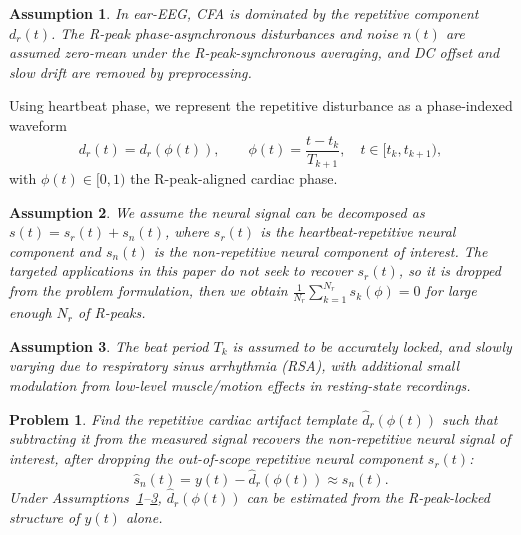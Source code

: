\documentclass[conference]{IEEEtran}
\newtheorem{assumption}{Assumption}
\newtheorem{problem}{Problem}
\begin{document}
\begin{assumption}\label{asm:cfa_dominant}
In ear-EEG, CFA is dominated by the repetitive component $d_r(t)$. The R-peak
phase-asynchronous disturbances and noise $n(t)$ are assumed zero-mean under the R-peak-synchronous averaging, and DC offset and slow drift are removed
by preprocessing.
\end{assumption}

Using heartbeat phase, we represent the repetitive disturbance as a phase-indexed waveform
\begin{equation}
d_r(t) = d_r\!\left(\phi(t)\right), \qquad
\phi(t) = \frac{t - t_k}{T_{k+1}}, \quad t \in [t_k, t_{k+1}),
\label{eq:phase_model}
\end{equation}
with $\phi(t)\in[0,1)$ the R-peak-aligned cardiac phase. 

\begin{assumption}\label{asm:neural_not_phase_locked}
We assume the neural signal can be decomposed as $s(t)=s_r(t)+s_n(t)$, where $s_r(t)$ is the
heartbeat-repetitive neural component and $s_n(t)$ is the non-repetitive neural component of interest.
The targeted applications in this paper do not seek to recover $s_r(t)$, so it is dropped from the
problem formulation, then we obtain $\frac{1}{N_r}\sum_{k=1}^{N_r} s_k(\phi) =0$ for large enough $N_r$ of R-peaks.
\end{assumption}
\begin{assumption}\label{asm:rpeak_T_varying}\label{asm:tk_slowly_varying}
The beat period $T_k$ is assumed to be accurately locked, and slowly varying due to respiratory sinus arrhythmia (RSA), with
additional small modulation from low-level muscle/motion effects in resting-state recordings.
\end{assumption}

\begin{problem}\label{prob:cfa_removal}
Find the repetitive cardiac artifact template $\hat{d}_r(\phi(t))$ such that subtracting it from
the measured signal recovers the non-repetitive neural signal of interest, after dropping the
out-of-scope repetitive neural component $s_r(t)$:
\begin{equation}
\hat{s}_n(t) = y(t) - \hat{d}_r\!\left(\phi(t)\right) \approx s_n(t).
\label{eq:cfa_goal}
\end{equation}
Under Assumptions~\ref{asm:cfa_dominant}--\ref{asm:rpeak_T_varying}, $\hat{d}_r(\phi(t))$ can be
estimated from the R-peak-locked structure of $y(t)$ alone.
\end{problem}
\end{document}
